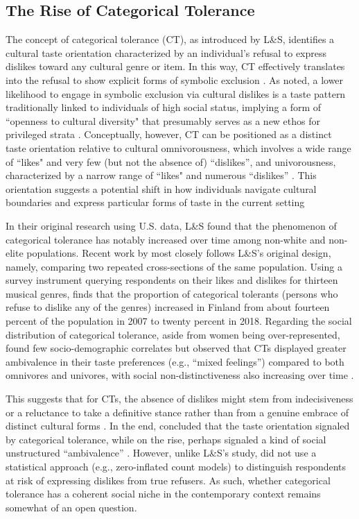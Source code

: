\documentclass[12pt]{article}
\begin{document}
\subsection*{The Rise of Categorical Tolerance}
The concept of categorical tolerance (CT), as introduced by L\&S, identifies a cultural taste orientation characterized by an individual's refusal to express dislikes toward any cultural genre or item. In this way, CT effectively translates into the refusal to show explicit forms of symbolic exclusion \citep{bryson1996anything-311}. As noted, a lower likelihood to engage in symbolic exclusion via cultural dislikes is a taste pattern traditionally linked to individuals of high social status, implying a form of ``openness to cultural diversity" that presumably serves as a new ethos for privileged strata \citep{ollivier2008modes-96f, lindblom2019anything-530}. Conceptually, however, CT can be positioned as a distinct taste orientation relative to cultural omnivorousness, which involves a wide range of ``likes" and very few (but not the absence of) ``dislikes'', and univorousness, characterized by a narrow range of ``likes" and numerous ``dislikes'' \citep{sonnett2004musical-961}. This orientation suggests a potential shift in how individuals navigate cultural boundaries and express particular forms of taste in the current setting \citep{lizardo2016end-4fb}

In their original research using U.S. data, L\&S found that the phenomenon of categorical tolerance has notably increased over time among non-white and non-elite populations. Recent work by \citet{lindblom2022growing-ded} most closely follows L\&S's original design, namely, comparing two repeated cross-sections of the same population. Using a survey instrument querying respondents on their likes and dislikes for thirteen musical genres, \citet{lindblom2022growing-ded} finds that the proportion of categorical tolerants (persons who refuse to dislike any of the genres) increased in Finland from about fourteen percent of the population in 2007 to twenty percent in 2018. Regarding the social distribution of categorical tolerance, aside from women being over-represented, \citet{lindblom2022growing-ded} found few socio-demographic correlates but observed that CTs displayed greater ambivalence in their taste preferences (e.g., ``mixed feelings'') compared to both omnivores and univores, with social non-distinctiveness also increasing over time \citep{lindblom2022growing-ded}. 

This suggests that for CTs, the absence of dislikes might stem from indecisiveness or a reluctance to take a definitive stance rather than from a genuine embrace of distinct cultural forms \citep{lindblom2022growing-ded}. In the end, \citet[p. 13]{lindblom2022growing-ded} concluded that the taste orientation signaled by categorical tolerance, while on the rise, perhaps signaled a kind of social unstructured ``ambivalence'' \citep{sonnett2004musical-961}. However, unlike L\&S's study, \citet{lindblom2022growing-ded} did not use a statistical approach (e.g., zero-inflated count models) to distinguish respondents at risk of expressing dislikes from true refusers. As such, whether categorical tolerance has a coherent social niche in the contemporary context remains somewhat of an open question. 
\end{document}
